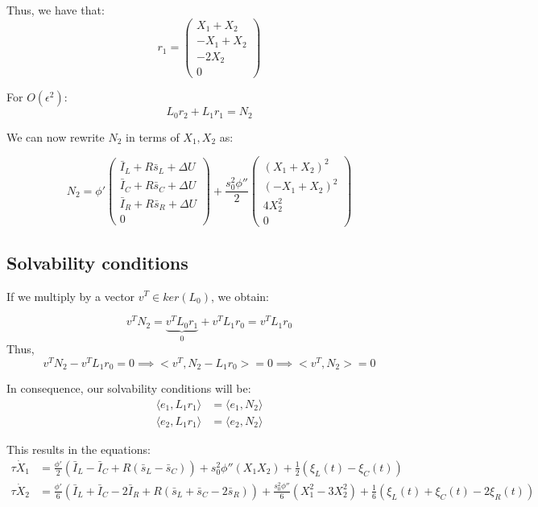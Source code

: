\documentclass[ENG]{fancynotes}
\begin{document}
 Thus, we have that:
 \[
r_{1} = \begin{pmatrix}X_1+X_2\\-X_1+X_2\\-2X_2\\0 \end{pmatrix} 
\]

For $O(\epsilon^2)$:
\[
L_0r_2 +L_1r_1 = N_2
\]

We can now rewrite $N_2$ in terms of $X_1, X_2$ as:

\[
N_2 = \phi'\begin{pmatrix}
\bar{I}_L + R\bar{s}_L +\Delta U  \\\bar{I}_C  + R\bar{s}_C +\Delta U\\ 
\bar{I}_R + R\bar{s}_R +\Delta U\\ 
0
\end{pmatrix} + \frac{s_0^2 \phi''}{2} 
\begin{pmatrix}
(X_1 +X_2)^2\\  
(-X_1 + X_2)^2\\  
4X_2^2\\ 
0
\end{pmatrix}
\]

\subsection{Solvability conditions}
If we multiply by a vector  $v^T  \in ker(L_0)$, we obtain:

$$
v^T N_2 = \underbrace{v^T L_0 r_1}_0 + v^T L_1 r_0 = v^T L_1 r_0
$$
Thus, 
$$
v^T N_2 - v^T L_1 r_0 = 0 \implies <v^T,  N_2 - L_1 r_0> = 0 \implies <v^T,  N_2 > = 0 
$$

In consequence, our solvability conditions will be:
\begin{equation}
\begin{aligned}
    \langle e_1, L_1 r_1 \rangle &= \langle e_1, N_2 \rangle \\
    \langle e_2, L_1 r_1 \rangle &= \langle e_2, N_2 \rangle
\end{aligned}
 \label{eq:solvability1}
\end{equation}

This results in the equations:
\begin{equation}
\begin{aligned}
\tau \dot{X}_1 &= \frac{\phi'}{2}(\bar{I}_L -  \bar{I}_C + R (\bar{s}_L - \bar{s}_C)) + s_0^2\phi''(X_1X_2) + \frac{1}{2}(\xi_L(t)-\xi_C(t)) \\[8pt]
\tau \dot{X}_2 &= \frac{\phi'}{6}(\bar{I}_L +  \bar{I}_C - 2 \bar{I}_R +  R (\bar{s}_L+ \bar{s}_C -2\bar{s}_R) ) + \frac{s_0^2\phi''}{6}(X_1^2-3X_2^2) + \frac{1}{6}(\xi_L(t)+\xi_C(t)-2\xi_R(t))
\end{aligned}
\label{eq:secondorder}
\end{equation}
\end{document}
